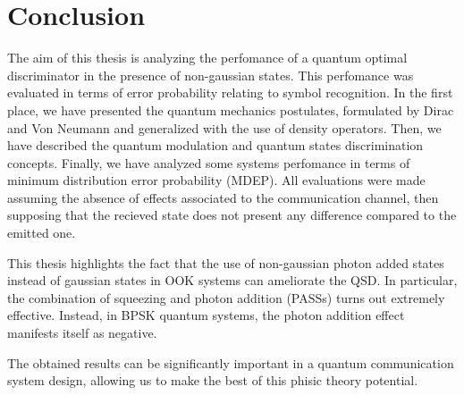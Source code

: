 
\chapter{Conclusion}
    The aim of this thesis is analyzing the perfomance of a quantum optimal discriminator in the 
    presence of non-gaussian states. This perfomance was evaluated in terms of error probability 
    relating to symbol recognition. 
    In the first place, we have presented the quantum mechanics postulates, formulated by Dirac and 
    Von Neumann and generalized with the use of density operators.
    Then, we have described the quantum modulation and quantum states discrimination concepts. 
    Finally, we have analyzed some systems perfomance in terms of minimum distribution error 
    probability (MDEP).
    All evaluations were made assuming the absence of effects associated to the communication channel, 
    then supposing that the recieved state does not present any difference compared to the emitted one.
    
    This thesis highlights the fact that the use of non-gaussian photon added states instead of gaussian 
    states in OOK systems can ameliorate the QSD.
    In particular, the combination of squeezing and photon addition (PASSs) turns out extremely effective.
    Instead, in BPSK quantum systems, the photon addition effect manifests itself as negative.

    The obtained results can be significantly important in a quantum communication system design, 
    allowing us to make the best of this phisic theory potential. 